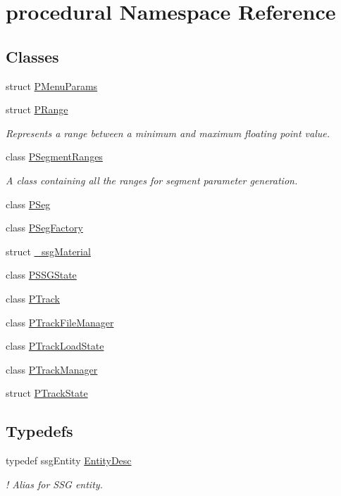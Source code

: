 \hypertarget{namespaceprocedural}{\section{procedural Namespace Reference}
\label{namespaceprocedural}
}
\subsection*{Classes}
\begin{DoxyCompactItemize}
\item 
struct \hyperlink{structprocedural_1_1_p_menu_params}{P\-Menu\-Params}
\item 
struct \hyperlink{structprocedural_1_1_p_range}{P\-Range}
\begin{DoxyCompactList}\small\item\em Represents a range between a minimum and maximum floating point value. \end{DoxyCompactList}\item 
class \hyperlink{classprocedural_1_1_p_segment_ranges}{P\-Segment\-Ranges}
\begin{DoxyCompactList}\small\item\em A class containing all the ranges for segment parameter generation. \end{DoxyCompactList}\item 
class \hyperlink{classprocedural_1_1_p_seg}{P\-Seg}
\item 
class \hyperlink{classprocedural_1_1_p_seg_factory}{P\-Seg\-Factory}
\item 
struct \hyperlink{structprocedural_1_1__ssg_material}{\-\_\-ssg\-Material}
\item 
class \hyperlink{classprocedural_1_1_p_s_s_g_state}{P\-S\-S\-G\-State}
\item 
class \hyperlink{classprocedural_1_1_p_track}{P\-Track}
\item 
class \hyperlink{classprocedural_1_1_p_track_file_manager}{P\-Track\-File\-Manager}
\item 
class \hyperlink{classprocedural_1_1_p_track_load_state}{P\-Track\-Load\-State}
\item 
class \hyperlink{classprocedural_1_1_p_track_manager}{P\-Track\-Manager}
\item 
struct \hyperlink{structprocedural_1_1_p_track_state}{P\-Track\-State}
\end{DoxyCompactItemize}
\subsection*{Typedefs}
\begin{DoxyCompactItemize}
\item 
\hypertarget{namespaceprocedural_ae4301ddb088c564b7e7b36903ecd6e23}{typedef ssg\-Entity \hyperlink{namespaceprocedural_ae4301ddb088c564b7e7b36903ecd6e23}{Entity\-Desc}}\label{namespaceprocedural_ae4301ddb088c564b7e7b36903ecd6e23}

\begin{DoxyCompactList}\small\item\em ! Alias for S\-S\-G entity. \end{DoxyCompactList}\end{DoxyCompactItemize}
